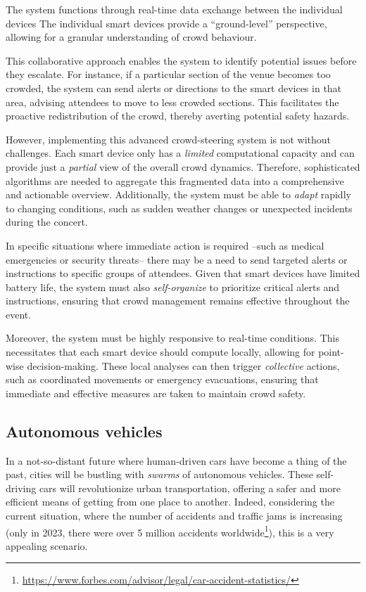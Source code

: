 The system functions through real-time data exchange 
 between the individual devices %
 The individual smart devices provide a ``ground-level'' perspective, 
 allowing for a granular understanding of crowd behaviour.

This collaborative approach enables the system to identify potential issues before they escalate. 
 For instance, if a particular section of the venue becomes too crowded, 
 the system can send alerts or directions to the smart devices in that area, 
 advising attendees to move to less crowded sections. 
 This facilitates the proactive redistribution of the crowd, 
 thereby averting potential safety hazards.

However, implementing this advanced crowd-steering system is not without challenges. 
 Each smart device only has a \emph{limited} computational capacity 
 and can provide just a \emph{partial} view of the overall crowd dynamics. 
Therefore, sophisticated algorithms are needed to aggregate 
 this fragmented data into a comprehensive and actionable overview. 
 Additionally, the system must be able to \emph{adapt} rapidly to changing conditions, 
 such as sudden weather changes or unexpected incidents during the concert.

In specific situations where immediate action is required 
 --such as medical emergencies or security threats-- 
 there may be a need to send targeted alerts or instructions to specific groups of attendees. 
 Given that smart devices have limited battery life, 
 the system must also \emph{self-organize} to prioritize critical alerts and instructions, 
 ensuring that crowd management remains effective throughout the event.

Moreover, the system must be highly responsive to real-time conditions. 
 This necessitates that each smart device should compute locally, 
 allowing for point-wise decision-making. 
 These local analyses can then trigger \emph{collective} actions, 
 such as coordinated movements or emergency evacuations, 
 ensuring that immediate and effective measures are taken to maintain crowd safety.

\subsection{Autonomous vehicles}
In a not-so-distant future
 where human-driven cars have become a thing of the past, 
 cities will be bustling with \emph{swarms} of autonomous vehicles. 
% 
These self-driving cars will revolutionize urban transportation, 
 offering a safer and more efficient means of getting from one place to another. 
Indeed, considering the current situation, 
 where the number of accidents and traffic jams is increasing (only in 2023, there were over 5 million accidents worldwide\footnote{\url{https://www.forbes.com/advisor/legal/car-accident-statistics/}}), 
 this is a very appealing scenario.

